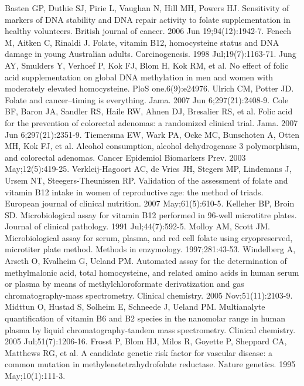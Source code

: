 \begin{thebibliography}{12}
		Basten GP, Duthie SJ, Pirie L, Vaughan N, Hill MH, Powers HJ. Sensitivity of markers of DNA stability and DNA repair activity to folate supplementation in healthy volunteers. British journal of cancer. 2006 Jun 19;94(12):1942-7. 
		Fenech M, Aitken C, Rinaldi J. Folate, vitamin B12, homocysteine status and DNA damage in young Australian adults. Carcinogenesis. 1998 Jul;19(7):1163-71. 
		Jung AY, Smulders Y, Verhoef P, Kok FJ, Blom H, Kok RM, et al. No effect of folic acid supplementation on global DNA methylation in men and women with moderately elevated homocysteine. PloS one.6(9):e24976. 
		Ulrich CM, Potter JD. Folate and cancer--timing is everything. Jama. 2007 Jun 6;297(21):2408-9. 
		Cole BF, Baron JA, Sandler RS, Haile RW, Ahnen DJ, Bresalier RS, et al. Folic acid for the prevention of colorectal adenomas: a randomized clinical trial. Jama. 2007 Jun 6;297(21):2351-9. 
		Tiemersma EW, Wark PA, Ocke MC, Bunschoten A, Otten MH, Kok FJ, et al. Alcohol consumption, alcohol dehydrogenase 3 polymorphism, and colorectal adenomas. Cancer Epidemiol Biomarkers Prev. 2003 May;12(5):419-25. 
		Verkleij-Hagoort AC, de Vries JH, Stegers MP, Lindemans J, Ursem NT, Steegers-Theunissen RP. Validation of the assessment of folate and vitamin B12 intake in women of reproductive age: the method of triads. European journal of clinical nutrition. 2007 May;61(5):610-5. 
		Kelleher BP, Broin SD. Microbiological assay for vitamin B12 performed in 96-well microtitre plates. Journal of clinical pathology. 1991 Jul;44(7):592-5. 
		Molloy AM, Scott JM. Microbiological assay for serum, plasma, and red cell folate using cryopreserved, microtiter plate method. Methods in enzymology. 1997;281:43-53. 
		Windelberg A, Arseth O, Kvalheim G, Ueland PM. Automated assay for the determination of methylmalonic acid, total homocysteine, and related amino acids in human serum or plasma by means of methylchloroformate derivatization and gas chromatography-mass spectrometry. Clinical chemistry. 2005 Nov;51(11):2103-9. 
		Midttun O, Hustad S, Solheim E, Schneede J, Ueland PM. Multianalyte quantification of vitamin B6 and B2 species in the nanomolar range in human plasma by liquid chromatography-tandem mass spectrometry. Clinical chemistry. 2005 Jul;51(7):1206-16. 
		Frosst P, Blom HJ, Milos R, Goyette P, Sheppard CA, Matthews RG, et al. A candidate genetic risk factor for vascular disease: a common mutation in methylenetetrahydrofolate reductase. Nature genetics. 1995 May;10(1):111-3. 

\end{thebibliography}
